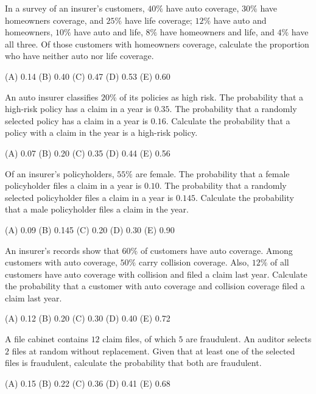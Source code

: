 \begin{practice}
In a survey of an insurer's customers, $40\%$ have auto coverage, $30\%$ have
homeowners coverage, and $25\%$ have life coverage; $12\%$ have auto and
homeowners, $10\%$ have auto and life, $8\%$ have homeowners and life, and
$4\%$ have all three. Of those customers with homeowners coverage, calculate the
proportion who have neither auto nor life coverage.

\medskip
(A) 0.14 \quad (B) 0.40 \quad (C) 0.47 \quad (D) 0.53 \quad (E) 0.60
\end{practice}

\begin{practice}
An auto insurer classifies $20\%$ of its policies as high risk. The probability
that a high-risk policy has a claim in a year is $0.35$. The probability that a
randomly selected policy has a claim in a year is $0.16$. Calculate the
probability that a policy with a claim in the year is a high-risk policy.

\medskip
(A) 0.07 \quad (B) 0.20 \quad (C) 0.35 \quad (D) 0.44 \quad (E) 0.56
\end{practice}

\begin{practice}
Of an insurer's policyholders, $55\%$ are female. The probability that a
female policyholder files a claim in a year is $0.10$. The probability that a
randomly selected policyholder files a claim in a year is $0.145$. Calculate
the probability that a male policyholder files a claim in the year.

\medskip
(A) 0.09 \quad (B) 0.145 \quad (C) 0.20 \quad (D) 0.30 \quad (E) 0.90
\end{practice}

\begin{practice}
An insurer's records show that $60\%$ of customers have auto coverage. Among
customers with auto coverage, $50\%$ carry collision coverage. Also, $12\%$ of
all customers have auto coverage with collision and filed a claim last year.
Calculate the probability that a customer with auto coverage and collision
coverage filed a claim last year.

\medskip
(A) 0.12 \quad (B) 0.20 \quad (C) 0.30 \quad (D) 0.40 \quad (E) 0.72
\end{practice}

\begin{practice}
A file cabinet contains $12$ claim files, of which $5$ are fraudulent. An
auditor selects $2$ files at random without replacement. Given that at least
one of the selected files is fraudulent, calculate the probability that both
are fraudulent.

\medskip
(A) 0.15 \quad (B) 0.22 \quad (C) 0.36 \quad (D) 0.41 \quad (E) 0.68
\end{practice}

